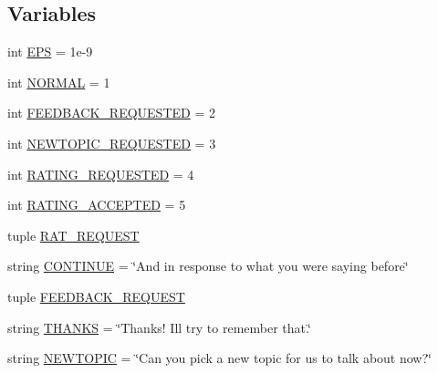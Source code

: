 \subsection*{Variables}
\begin{DoxyCompactItemize}
\item 
int \hyperlink{namespaceprojects_1_1self__feeding_1_1self__feeding__agent_adb566d55230513743dfab4246460645b}{E\+PS} = 1e-\/9
\item 
int \hyperlink{namespaceprojects_1_1self__feeding_1_1self__feeding__agent_ab9ab117a41ef75cfa0115c2af5ccad15}{N\+O\+R\+M\+AL} = 1
\item 
int \hyperlink{namespaceprojects_1_1self__feeding_1_1self__feeding__agent_a9ebf02e849caf455379454a96c9a8db0}{F\+E\+E\+D\+B\+A\+C\+K\+\_\+\+R\+E\+Q\+U\+E\+S\+T\+ED} = 2
\item 
int \hyperlink{namespaceprojects_1_1self__feeding_1_1self__feeding__agent_aa4a0962c5b19c268a7aa20acd16592c5}{N\+E\+W\+T\+O\+P\+I\+C\+\_\+\+R\+E\+Q\+U\+E\+S\+T\+ED} = 3
\item 
int \hyperlink{namespaceprojects_1_1self__feeding_1_1self__feeding__agent_a3cb57842c93b58dda3e2fd27bf4fcd29}{R\+A\+T\+I\+N\+G\+\_\+\+R\+E\+Q\+U\+E\+S\+T\+ED} = 4
\item 
int \hyperlink{namespaceprojects_1_1self__feeding_1_1self__feeding__agent_aad63b09a7265f16db71928cf1bde4d64}{R\+A\+T\+I\+N\+G\+\_\+\+A\+C\+C\+E\+P\+T\+ED} = 5
\item 
tuple \hyperlink{namespaceprojects_1_1self__feeding_1_1self__feeding__agent_aaf7234c190ee12d5c2f988b378f3b4ae}{R\+A\+T\+\_\+\+R\+E\+Q\+U\+E\+ST}
\item 
string \hyperlink{namespaceprojects_1_1self__feeding_1_1self__feeding__agent_a50d8b03511e40830aedcef202ee917e8}{C\+O\+N\+T\+I\+N\+UE} = \char`\"{}And in response to what you were saying before\char`\"{}
\item 
tuple \hyperlink{namespaceprojects_1_1self__feeding_1_1self__feeding__agent_a7b9640bf511d0e679707f1ff84520a55}{F\+E\+E\+D\+B\+A\+C\+K\+\_\+\+R\+E\+Q\+U\+E\+ST}
\item 
string \hyperlink{namespaceprojects_1_1self__feeding_1_1self__feeding__agent_af7f64874180646e686e1eec12f6e7fe3}{T\+H\+A\+N\+KS} = \char`\"{}Thanks! I\textquotesingle{}ll try to remember that.\char`\"{}
\item 
string \hyperlink{namespaceprojects_1_1self__feeding_1_1self__feeding__agent_a213ea6c2e8a632d27e80b307747d85e8}{N\+E\+W\+T\+O\+P\+IC} = \char`\"{}Can you pick a new topic for us to talk about now?\char`\"{}
\end{DoxyCompactItemize}


